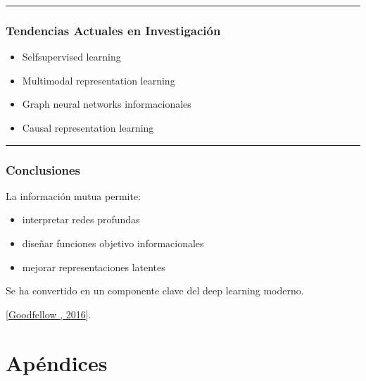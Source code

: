 \documentclass[letterpaper,10pt,english]{jupyterBook}
\begin{document}
\bigskip\hrule\bigskip



\section{Tendencias Actuales en Investigación}
\label{\detokenize{04_data_science_applications/deep_learning_mi:tendencias-actuales-en-investigacion}}\begin{itemize}
\item {} 
\sphinxAtStartPar
Self\sphinxhyphen{}supervised learning

\item {} 
\sphinxAtStartPar
Multimodal representation learning

\item {} 
\sphinxAtStartPar
Graph neural networks informacionales

\item {} 
\sphinxAtStartPar
Causal representation learning

\end{itemize}


\bigskip\hrule\bigskip



\section{Conclusiones}
\label{\detokenize{04_data_science_applications/deep_learning_mi:conclusiones}}
\sphinxAtStartPar
La información mutua permite:
\begin{itemize}
\item {} 
\sphinxAtStartPar
interpretar redes profundas

\item {} 
\sphinxAtStartPar
diseñar funciones objetivo informacionales

\item {} 
\sphinxAtStartPar
mejorar representaciones latentes

\end{itemize}

\sphinxAtStartPar
Se ha convertido en un componente clave del deep learning moderno.

\sphinxAtStartPar
{[}\hyperlink{cite.05_appendices/references:id8}{Goodfellow , 2016}{]}.

\sphinxstepscope


\part{Apéndices}
\end{document}
